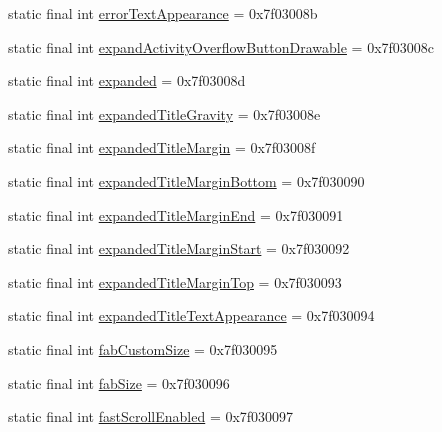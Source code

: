 \begin{DoxyCompactItemize}
\item 
static final int \mbox{\hyperlink{classandroid_1_1support_1_1design_1_1_r_1_1attr_aff80f59fbd99ca8b22758a04767ac7d5}{error\+Text\+Appearance}} = 0x7f03008b
\item 
static final int \mbox{\hyperlink{classandroid_1_1support_1_1design_1_1_r_1_1attr_a294fef173d17119d81a2a22e1b059994}{expand\+Activity\+Overflow\+Button\+Drawable}} = 0x7f03008c
\item 
static final int \mbox{\hyperlink{classandroid_1_1support_1_1design_1_1_r_1_1attr_a8b2f1952a1f1858370c55b77a5c8fdf0}{expanded}} = 0x7f03008d
\item 
static final int \mbox{\hyperlink{classandroid_1_1support_1_1design_1_1_r_1_1attr_af9227f3d0dd94b70bf8560495793ef46}{expanded\+Title\+Gravity}} = 0x7f03008e
\item 
static final int \mbox{\hyperlink{classandroid_1_1support_1_1design_1_1_r_1_1attr_aa82f302d274ae27a8c9353fadca028c8}{expanded\+Title\+Margin}} = 0x7f03008f
\item 
static final int \mbox{\hyperlink{classandroid_1_1support_1_1design_1_1_r_1_1attr_a3eab7e6efce6d1e0bab6faf32ed77c76}{expanded\+Title\+Margin\+Bottom}} = 0x7f030090
\item 
static final int \mbox{\hyperlink{classandroid_1_1support_1_1design_1_1_r_1_1attr_ad547616c8f37d753a16d55b3af437504}{expanded\+Title\+Margin\+End}} = 0x7f030091
\item 
static final int \mbox{\hyperlink{classandroid_1_1support_1_1design_1_1_r_1_1attr_a117547f2f75572ed87f35bf8d2174c3c}{expanded\+Title\+Margin\+Start}} = 0x7f030092
\item 
static final int \mbox{\hyperlink{classandroid_1_1support_1_1design_1_1_r_1_1attr_ab480074094d112513cccb460ca7d08ce}{expanded\+Title\+Margin\+Top}} = 0x7f030093
\item 
static final int \mbox{\hyperlink{classandroid_1_1support_1_1design_1_1_r_1_1attr_a0093d7cf21b5718aa96f111e023ca986}{expanded\+Title\+Text\+Appearance}} = 0x7f030094
\item 
static final int \mbox{\hyperlink{classandroid_1_1support_1_1design_1_1_r_1_1attr_a8cfc75024317cc63d58af64bd5c0cc68}{fab\+Custom\+Size}} = 0x7f030095
\item 
static final int \mbox{\hyperlink{classandroid_1_1support_1_1design_1_1_r_1_1attr_ae50af000a6d2566abf822dd923f0e6bc}{fab\+Size}} = 0x7f030096
\item 
static final int \mbox{\hyperlink{classandroid_1_1support_1_1design_1_1_r_1_1attr_ab90b19f698fc461d6fecd4a55436a4a4}{fast\+Scroll\+Enabled}} = 0x7f030097

\end{DoxyCompactItemize}
